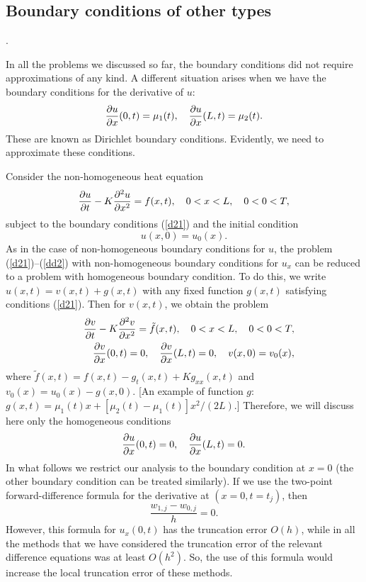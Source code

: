 \subsection{Boundary conditions of other types}.

 
In all the problems we discussed so far, the
boundary conditions did not require approximations of any kind.
A different situation arises when we have the boundary conditions for the derivative
of $u$:
\begin{equation}
\frac{{\partial} u}{{\partial} x}(0,t)=\mu_{1}(t), \quad
\frac{{\partial} u}{{\partial} x}(L,t)=\mu_{2}(t). \label{d21}
\end{equation}
These are known as Dirichlet boundary conditions.
Evidently, we need to approximate these conditions.

\vskip 3mm
 
Consider the non-homogeneous heat equation
\begin{equation}
\frac{{\partial} u}{{\partial} t} - K\frac{{\partial}^{2} u}{{\partial} x^{2}}=f(x,t), \quad
0<x< L, \quad 0<0<T,   \label{dd1}
\end{equation}
subject to the boundary conditions (\ref{d21}) and the initial condition
\begin{equation}
u(x, 0) = u_{0}(x).   \label{dd2}
\end{equation}
As in the case of non-homogeneous boundary conditions for $u$, the problem
(\ref{d21})--(\ref{dd2}) with non-homogeneous boundary conditions for $u_{x}$
can be reduced to
a problem with homogeneous boundary condition. To do this, we write
$u(x,t)=v(x,t)+g(x,t)$ with any fixed function $g(x,t)$ satisfying conditions
(\ref{d21}). Then for $v(x,t)$, we obtain the problem
\begin{eqnarray}
&&\frac{{\partial} v}{{\partial} t} - K\frac{{\partial}^{2} v}{{\partial} x^{2}}=\tilde{f}(x,t), \quad
0<x< L, \quad 0<0<T,   \nonumber \\
&&\frac{{\partial} v}{{\partial} x}(0,t)=0, \quad
\frac{{\partial} v}{{\partial} x}(L,t)=0, \quad
v(x, 0) = v_{0}(x), \nonumber
\end{eqnarray}
where $\tilde{f}(x,t)=f(x,t)-g_{t}(x,t)+Kg_{xx}(x,t)$ and $v_{0}(x)=u_{0}(x)-g(x,0)$.
[An example of function $g$: $g(x,t)=\mu_{1}(t)x+[\mu_{2}(t)-\mu_{1}(t)]x^2/(2L)$.]
Therefore, we will discuss here only the homogeneous conditions
\begin{equation}
\frac{{\partial} u}{{\partial} x}(0,t)=0, \quad
\frac{{\partial} u}{{\partial} x}(L,t)=0. \label{d22}
\end{equation}
In what follows we restrict our analysis to the boundary condition at $x=0$
(the other boundary condition can be treated similarly).
If we use the two-point forward-difference formula for the derivative
at $(x=0, t=t_{j})$, then
\[
\frac{w_{1,j}-w_{0,j}}{h}=0 .
\]
However, this formula for $u_{x}(0,t)$ has the truncation error $O(h)$,
while in all the methods that we have considered the truncation error
of the relevant difference equations was
at least $O(h^2)$. So, the use of this formula would increase the local
truncation error of these methods.

